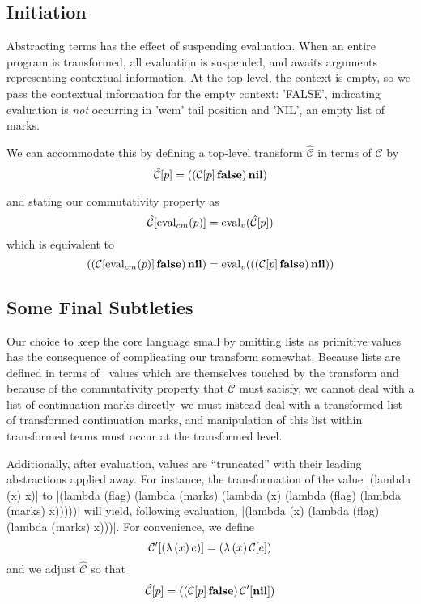 \subsection{Initiation}

Abstracting terms has the effect of suspending evaluation. When an entire program is transformed, all evaluation is suspended, and awaits arguments representing contextual information. At the top level, the context is empty, so we pass the contextual information for the empty context: \scheme'FALSE', indicating evaluation is \emph{not} occurring in \scheme'wcm' tail position and \scheme'NIL', an empty list of marks.

We can accommodate this by defining a top-level transform $\hat{\mathcal{C}}$ in terms of $\mathcal{C}$ by
\begin{equation}
\hat{\mathcal{C}}[p]=((\mathcal{C}[p]\,\mathbf{false})\,\mathbf{nil})
\end{equation}

and stating our commutativity property as
\begin{equation}
\label{commutativity-property}
\hat{\mathcal{C}}[\mathrm{eval}_{cm}(p)]=\mathrm{eval}_v(\hat{\mathcal{C}}[p])
\end{equation}
which is equivalent to
\begin{equation}
((\mathcal{C}[\mathrm{eval}_{cm}(p)]\,\mathbf{false})\,\mathbf{nil})=\mathrm{eval}_v(((\mathcal{C}[p]\,\mathbf{false})\,\mathbf{nil}))
\end{equation}

\subsection{Some Final Subtleties}

Our choice to keep the core language small by omitting lists as primitive values has the consequence of complicating our transform somewhat. Because lists are defined in terms of \lc\ values which are themselves touched by the transform and because of the commutativity property that $\mathcal{C}$ must satisfy, we cannot deal with a list of continuation marks directly--we must instead deal with a transformed list of transformed continuation marks, and manipulation of this list within transformed terms must occur at the transformed level.

Additionally, after evaluation, values are ``truncated'' with their leading abstractions applied away. For instance, the transformation of the value \scheme|(lambda (x) x)| to \scheme|(lambda (flag) (lambda (marks) (lambda (x) (lambda (flag) (lambda (marks) x)))))| will yield, following evaluation, \scheme|(lambda (x) (lambda (flag) (lambda (marks) x)))|. For convenience, we define 
\begin{equation}
\mathcal{C}'[(\lambda\,(x)\,e)]=(\lambda\,(x)\,\mathcal{C}[e])
\end{equation}
and we adjust $\hat{\mathcal{C}}$ so that
\begin{equation}
\hat{\mathcal{C}}[p]=((\mathcal{C}[p]\,\mathbf{false})\,\mathcal{C}'[\mathbf{nil}])
\end{equation}

